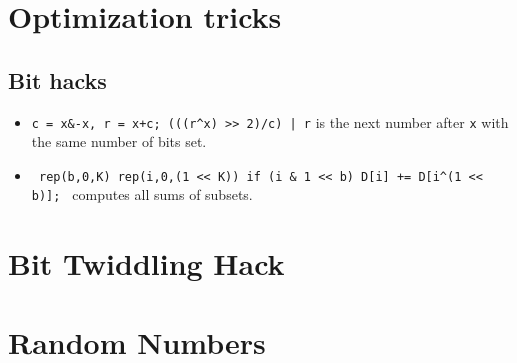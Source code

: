 \section{Optimization tricks}
	\subsection{Bit hacks}
		\begin{itemize}
			\item \texttt{c = x\&-x, r = x+c; (((r\^{}x) >> 2)/c) | r} is the next number after \texttt{x} with the same number of bits set.
			\item \texttt{ rep(b,0,K) rep(i,0,(1 << K)) if (i \& 1 << b) D[i] += D[i\^{}(1 << b)]; } computes all sums of subsets.
		\end{itemize}
	
	
\section {Bit Twiddling Hack}
\section {Random Numbers}
